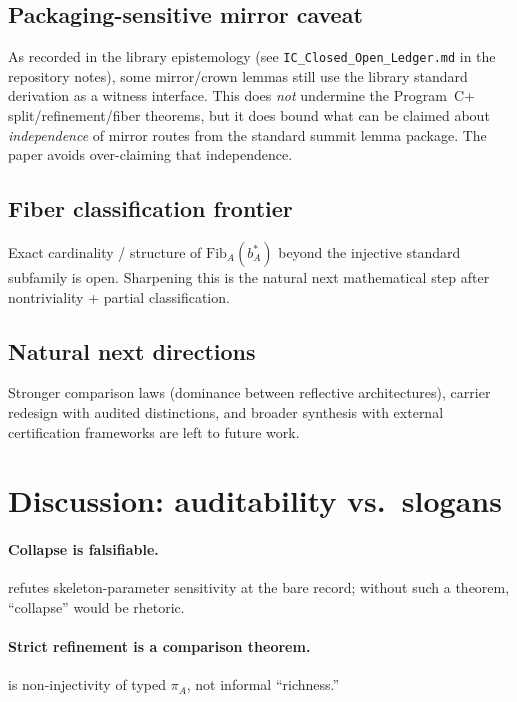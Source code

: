 \documentclass[11pt]{article}
\begin{document}
\subsection{Packaging-sensitive mirror caveat}\label{sec:limitations-packaging}
As recorded in the library epistemology (see \texttt{IC\_Closed\_Open\_Ledger.md} in the repository notes), some mirror/crown lemmas still use the library standard derivation as a witness interface. This does \emph{not} undermine the Program~C+ split/refinement/fiber theorems, but it does bound what can be claimed about \emph{independence} of mirror routes from the standard summit lemma package. The paper avoids over-claiming that independence.

\subsection{Fiber classification frontier}\label{sec:limitations-fiber}
Exact cardinality / structure of $\mathrm{Fib}_A(b^\ast_A)$ beyond the injective standard subfamily is open. Sharpening this is the natural next mathematical step after nontriviality + partial classification.

\subsection{Natural next directions}\label{sec:limitations-next}
Stronger comparison laws (dominance between reflective architectures), carrier redesign with audited distinctions, and broader synthesis with external certification frameworks are left to future work.

\section{Discussion: auditability vs.\ slogans}\label{sec:discussion-law}

\paragraph{Collapse is falsifiable.}
 refutes skeleton-parameter sensitivity at the bare record; without such a theorem, ``collapse'' would be rhetoric.

\paragraph{Strict refinement is a comparison theorem.}
 is non-injectivity of typed $\pi_A$, not informal ``richness.''
\end{document}
